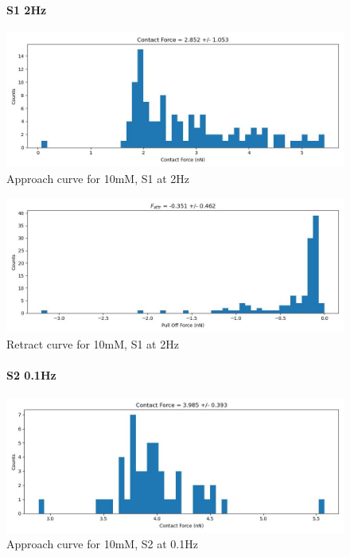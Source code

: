\begin{figure}[h!]
\paragraph{S1 2Hz}
\centering
\includegraphics[width=\textwidth]{chapter7/Tip speed/10mM/S1 2Hz/approach_f_c_hist.jpg}
\caption{Approach curve for 10mM, S1 at 2Hz}
\end{figure}

\begin{figure}[h!]
\centering
\includegraphics[width=\textwidth]{chapter7/Tip speed/10mM/S1 2Hz/retract_f_a_hist.jpg}
\caption{Retract curve for 10mM, S1 at 2Hz}
\end{figure}
\newpage


\begin{figure}[h!]
\paragraph{S2 0.1Hz}
\centering
\includegraphics[width=\textwidth]{chapter7/Tip speed/10mM/S2 0.1Hz/approach_f_c_hist.jpg}
\caption{Approach curve for 10mM, S2 at 0.1Hz}
\end{figure}

